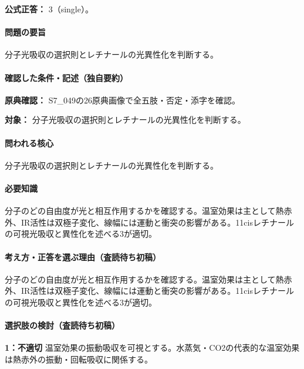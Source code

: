 \textbf{公式正答：} 3（single）。

\paragraph{問題の要旨} 分子光吸収の選択則とレチナールの光異性化を判断する。

\paragraph{確認した条件・記述（独自要約）}\mbox{}\par

\noindent\textbf{原典確認：} S7\_049の26原典画像で全五肢・否定・添字を確認。\par

\noindent\textbf{対象：} 分子光吸収の選択則とレチナールの光異性化を判断する。\par

\paragraph{問われる核心} 分子光吸収の選択則とレチナールの光異性化を判断する。

\paragraph{必要知識} 分子のどの自由度が光と相互作用するかを確認する。温室効果は主として熱赤外、IR活性は双極子変化、線幅には運動と衝突の影響がある。11cisレチナールの可視光吸収と異性化を述べる3が適切。

\paragraph{考え方・正答を選ぶ理由（査読待ち初稿）} 分子のどの自由度が光と相互作用するかを確認する。温室効果は主として熱赤外、IR活性は双極子変化、線幅には運動と衝突の影響がある。11cisレチナールの可視光吸収と異性化を述べる3が適切。

\paragraph{選択肢の検討（査読待ち初稿）}\mbox{}\par

\noindent\textbf{1：不適切} 温室効果の振動吸収を可視とする。水蒸気・CO2の代表的な温室効果は熱赤外の振動・回転吸収に関係する。\par

